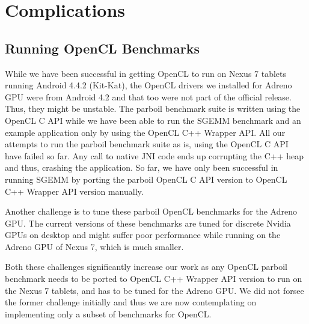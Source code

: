 \section*{Complications}
\subsection*{Running OpenCL Benchmarks}


While we have been successful in getting OpenCL to run on Nexus 7 tablets
running Android 4.4.2 (Kit-Kat), the OpenCL drivers we installed for Adreno
GPU were from
Android 4.2 and that too were not part of the official release. Thus, they might
be unstable. The parboil benchmark suite is written using the OpenCL C API while
we have been able to run the SGEMM benchmark and an example application only by using
the OpenCL C++ Wrapper API. All our attempts to run the parboil benchmark suite as
is, using the OpenCL C API have failed so far. Any call to native JNI code
ends up corrupting the C++ heap and thus, crashing the application. So far, we
have only been successful in running SGEMM by porting the parboil OpenCL C
API version to OpenCL C++ Wrapper API version manually.

Another challenge is to tune these parboil OpenCL benchmarks for the Adreno GPU.
The current versions of these benchmarks are tuned for discrete Nvidia GPUs on desktop and might
suffer poor performance while running on the Adreno GPU of Nexus 7, which is much
smaller.

Both these challenges significantly
increase our work as any OpenCL parboil benchmark needs to be ported to OpenCL
C++ Wrapper API version to run on the Nexus 7 tablets, and has to be tuned for
the Adreno GPU. We did not forsee the former
challenge initially and thus we are now contemplating on implementing only a
subset of benchmarks for OpenCL.

